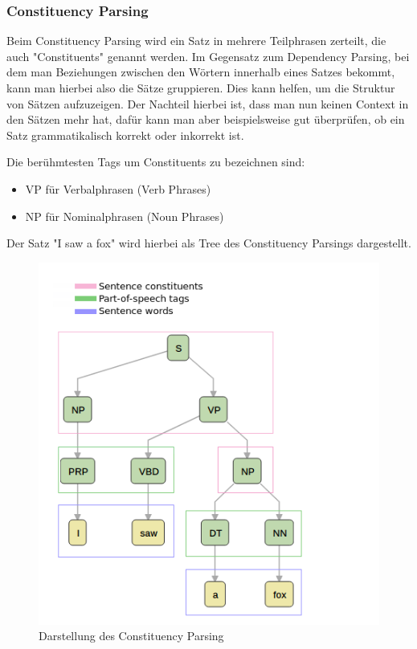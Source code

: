 \subsubsection{Constituency Parsing}

Beim Constituency Parsing wird ein Satz in mehrere Teilphrasen zerteilt, die auch "Constituents" genannt werden.
Im Gegensatz zum Dependency Parsing, bei dem man Beziehungen zwischen den Wörtern innerhalb eines Satzes bekommt, kann man hierbei also die Sätze gruppieren.
Dies kann helfen, um die Struktur von Sätzen aufzuzeigen.
Der Nachteil hierbei ist, dass man nun keinen Context in den Sätzen mehr hat, dafür kann man aber beispielsweise gut überprüfen, ob ein Satz grammatikalisch korrekt oder inkorrekt ist.\cite{machineLearningTextAnalysis}

Die berühmtesten Tags um Constituents zu bezeichnen sind:

\begin{itemize}
    \item VP für Verbalphrasen (Verb Phrases)
    \item NP für Nominalphrasen (Noun Phrases)
\end{itemize}

Der Satz "I saw a fox" wird hierbei als Tree des Constituency Parsings dargestellt.

\begin{figure}[hbt!]
    \centering
    \includegraphics[scale=0.5]{pics/constituency_parse_tree}
    \caption{Darstellung des Constituency Parsing~\cite{dependencyVsConstituencyParsing}}
    \label{fig:constituency_parsing_tree}
\end{figure}

